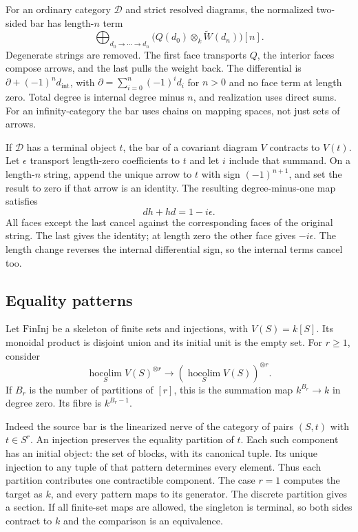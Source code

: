 For an ordinary category $\mathcal D$ and strict resolved
diagrams, the normalized two-sided bar has length-$n$ term
\begin{equation}\label{eq:vol2-weighted-bar}
 \bigoplus_{d_0\to\cdots\to d_n}
          \bigl(Q(d_0)\otimes_k\widetilde W(d_n)\bigr)[n].
\end{equation}
Degenerate strings are removed. The first face transports
$Q$, the interior faces compose arrows, and the last pulls
the weight back. The differential is
$\partial+(-1)^nd_{\mathrm{int}}$, with
$\partial=\sum_{i=0}^n(-1)^id_i$ for $n>0$ and no face
term at length zero. Total degree is internal degree
minus $n$, and realization uses direct sums. For an
infinity-category the bar uses chains on mapping spaces,
not just sets of arrows.

If $\mathcal D$ has a terminal object $t$, the bar of
a covariant diagram $V$ contracts to $V(t)$. Let
$\epsilon$ transport length-zero coefficients to $t$
and let $i$ include that summand. On a length-$n$ string,
append the unique arrow to $t$ with sign $(-1)^{n+1}$,
and set the result to zero if that arrow is an identity.
The resulting degree-minus-one map satisfies
\begin{equation}\label{eq:vol2-terminal-contraction}
 dh+hd=1-i\epsilon.
\end{equation}
All faces except the last cancel against the corresponding
faces of the original string. The last gives the identity;
at length zero the other face gives $-i\epsilon$.
The length change reverses the internal differential sign,
so the internal terms cancel too.

\subsection{Equality patterns}

Let $\mathrm{FinInj}$ be a skeleton of finite sets and
injections, with $V(S)=k[S]$. Its monoidal product is
disjoint union and its initial unit is the empty set.
For $r\geq1$, consider
\[
 \operatorname*{hocolim}_S V(S)^{\otimes r}
       \longrightarrow
       \left(\operatorname*{hocolim}_SV(S)\right)^{\otimes r}.
\]
If $B_r$ is the number of partitions of $[r]$, this is
the summation map $k^{B_r}\to k$ in degree zero.
Its fibre is $k^{B_r-1}$.

Indeed the source bar is the linearized nerve of the
category of pairs $(S,t)$ with $t\in S^r$. An injection
preserves the equality partition of $t$. Each such
component has an initial object: the set of blocks,
with its canonical tuple. Its unique injection to any
tuple of that pattern determines every element. Thus
each partition contributes one contractible component.
The case $r=1$ computes the target as $k$, and every
pattern maps to its generator. The discrete partition
gives a section. If all finite-set maps are allowed,
the singleton is terminal, so both sides contract to
$k$ and the comparison is an equivalence.

